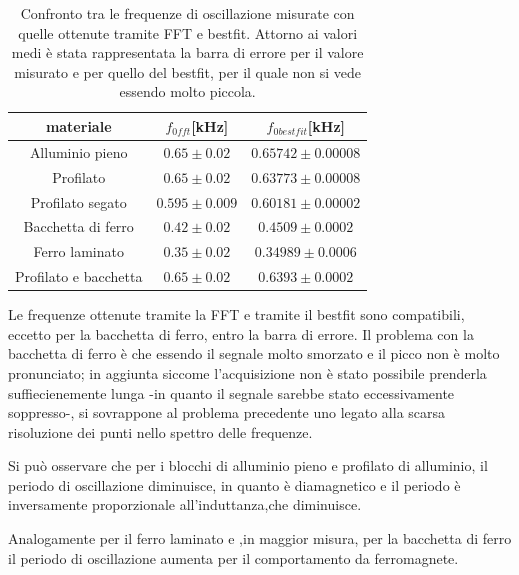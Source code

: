 \documentclass{article}
\begin{document}
        \begin{table}[H]
            \centering
            \caption{Confronto tra le frequenze di oscillazione misurate con quelle ottenute tramite FFT e bestfit.
                    Attorno ai valori medi è stata rappresentata la barra di errore per il valore
                    misurato e per quello del bestfit, per il quale non si vede essendo molto piccola.}
                \begin{tabular}{ccc}
                    materiale           &   $f_{0fft}$[kHz]     & $f_{0bestfit}$[kHz] \\
                    \hline
                    Alluminio pieno     & $0.65\pm0.02$         & $0.65742\pm0.00008$ \\
                    Profilato           & $0.65\pm0.02$         & $0.63773\pm0.00008$ \\
                    Profilato segato    & $0.595\pm0.009$       & $0.60181\pm0.00002$ \\
                    Bacchetta di ferro  & $0.42\pm0.02$         & $0.4509\pm0.0002$ \\
                    Ferro laminato      & $0.35\pm0.02$         & $0.34989\pm0.0006$ \\
                    Profilato e bacchetta& $0.65\pm0.02$        & $0.6393\pm0.0002$ \\  
                \end{tabular}
                \label{tab:mat_smor}

        \end{table}

        Le frequenze ottenute tramite la FFT e tramite il bestfit sono compatibili, 
        eccetto per la bacchetta di ferro, entro la barra di errore.
        Il problema con la bacchetta di ferro è che essendo il segnale molto smorzato 
        e il picco non è molto pronunciato; in aggiunta siccome l'acquisizione non è stato
        possibile prenderla suffiecienemente lunga -in quanto il segnale sarebbe stato 
        eccessivamente soppresso-, si sovrappone al problema precedente 
        uno legato alla scarsa risoluzione dei punti nello spettro delle frequenze.

        
        Si può osservare che per i blocchi di alluminio pieno e profilato di alluminio,
        il periodo di oscillazione diminuisce, in quanto è diamagnetico e il periodo
        è inversamente proporzionale all'induttanza,che diminuisce.
        
        Analogamente per il ferro laminato e ,in maggior misura, per la bacchetta di 
        ferro il periodo di oscillazione aumenta per il comportamento da ferromagnete.
        
\end{document}
